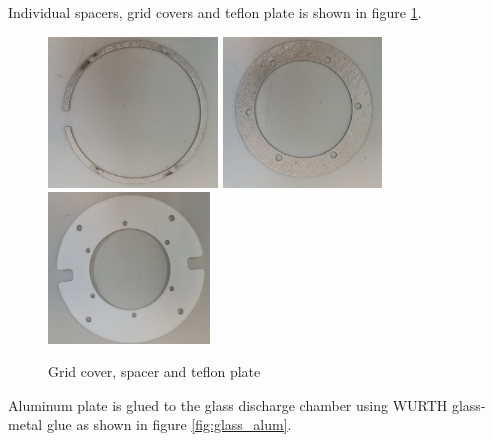 Individual spacers, grid covers and teflon plate is shown in figure \ref{fig:realelements}.

\begin{figure}[ht]
    \centering
    \includegraphics[height=4cm]{fig/assm/real_cover.jpg}
    \includegraphics[height=4cm]{fig/assm/real_spacer.jpg}
    \includegraphics[height=4cm]{fig/assm/real_teflon.jpg}
    \caption{Grid cover, spacer and teflon plate}
    \label{fig:realelements}
\end{figure}
\newpage
Aluminum plate is glued to the glass discharge chamber using WURTH glass-metal glue as shown in figure \ref{fig:glass_alum}. 

